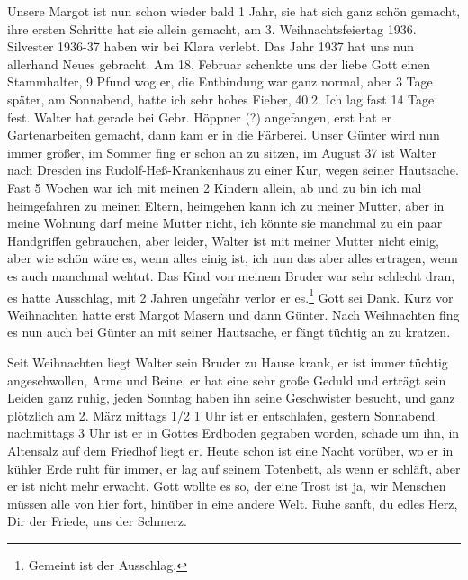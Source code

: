 \documentclass[a5paper,11pt,openany]{book}
\newcommand{\seite}[1]{\leavevmode\marginpar{\footnotesize\itshape\raggedright #1}\ignorespaces}
\newcommand{\jahr}[1]{\par\medskip\noindent{\scshape #1}\par\nopagebreak}
\begin{document}
\jahr{Jahr 1936.}
\seite{40}
Unsere Margot ist nun schon wieder bald 1 Jahr, sie hat sich ganz schön gemacht,
  ihre ersten Schritte hat sie allein gemacht, am 3. Weihnachtsfeiertag 1936.
Silvester 1936-37 haben wir bei Klara verlebt.
Das Jahr 1937 hat uns nun allerhand Neues gebracht.
Am 18. Februar schenkte uns der liebe Gott einen Stammhalter, 9 Pfund wog er, die Entbindung war ganz normal,
  aber 3 Tage später, am Sonnabend, hatte ich sehr hohes Fieber, 40,2.
Ich lag fast 14 Tage fest.
Walter hat gerade bei Gebr. Höppner (?) angefangen, erst hat er Gartenarbeiten gemacht, dann kam
\seite{41}
er in die Färberei.
Unser Günter wird nun immer größer, im Sommer fing er schon an zu sitzen,
  im August 37 ist Walter nach Dresden ins Rudolf-Heß-Krankenhaus zu einer Kur, wegen seiner Hautsache.
Fast 5 Wochen war ich mit meinen 2 Kindern allein,
  ab und zu bin ich mal heimgefahren zu meinen Eltern, heimgehen kann ich zu meiner Mutter,
  aber in meine Wohnung darf meine Mutter nicht, ich könnte sie manchmal zu ein paar Handgriffen gebrauchen, aber leider,
  Walter ist mit meiner Mutter nicht einig, aber wie schön wäre es, wenn alles einig ist, ich
\seite{42}
[muss] nun das aber alles ertragen, wenn es auch manchmal wehtut.
Das Kind von meinem Bruder war sehr schlecht dran, es hatte Ausschlag, mit 2 Jahren ungefähr verlor er es.\footnote{Gemeint ist der Ausschlag.}
Gott sei Dank.
Kurz vor Weihnachten hatte erst Margot Masern und dann Günter.
Nach Weihnachten fing es nun auch bei Günter an mit seiner Hautsache, er fängt tüchtig an zu kratzen.

\jahr{Jahr 1938.}
Seit Weihnachten liegt Walter sein Bruder zu Hause krank,
  er ist immer tüchtig angeschwollen, Arme und Beine,
  er hat eine sehr große Geduld und erträgt sein Leiden ganz ruhig, jeden Sonntag
\seite{43}
haben ihn seine Geschwister besucht, und ganz plötzlich am 2. März mittags 1/2 1 Uhr ist er entschlafen,
  gestern Sonnabend nachmittags 3 Uhr ist er in Gottes Erdboden gegraben worden,
  schade um ihn, in Altensalz auf dem Friedhof liegt er.
Heute schon ist eine Nacht vorüber, wo er in kühler Erde ruht für immer,
  er lag auf seinem Totenbett, als wenn er schläft, aber er ist nicht mehr erwacht.
Gott wollte es so, der eine Trost ist ja, wir Menschen müssen alle von hier fort, hinüber in eine andere Welt.
Ruhe sanft, du edles Herz,\\
Dir der Friede, uns der Schmerz.
\end{document}
